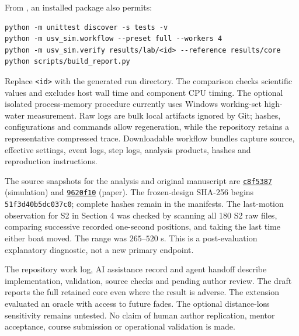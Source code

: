 From , an installed package also permits:
\begin{verbatim}
python -m unittest discover -s tests -v
python -m usv_sim.workflow --preset full --workers 4
python -m usv_sim.verify results/lab/<id> --reference results/core
python scripts/build_report.py
\end{verbatim}
Replace \texttt{<id>} with the generated run directory. The comparison checks scientific values and excludes host wall time and component CPU timing. The optional isolated process-memory procedure currently uses Windows working-set high-water measurement. Raw logs are bulk local artifacts ignored by Git; hashes, configurations and commands allow regeneration, while the repository retains a representative compressed trace. Downloadable workflow bundles capture source, effective settings, event logs, step logs, analysis products, hashes and reproduction instructions.



The source snapshots for the analysis and original manuscript are \href{https://github.com/ADreLOI/RMSW-Project/tree/c8f5387}{\texttt{c8f5387}} (simulation) and \href{https://github.com/ADreLOI/RMSW-Project/tree/9620f10da721a64ccd2bc245ba4da389b17d8436}{\texttt{9620f10}} (paper). The frozen-design SHA-256 begins \texttt{51f3d40b5dc037c0}; complete hashes remain in the manifests. The last-motion observation for S2 in Section 4 was checked by scanning all 180 S2 raw files, comparing successive recorded one-second positions, and taking the last time either boat moved. The range was $265$--$520$ s. This is a post-evaluation explanatory diagnostic, not a new primary endpoint.

The repository work log, AI assistance record and agent handoff describe implementation, validation, source checks and pending author review. The draft reports the full retained core even where the result is adverse. The extension evaluated an oracle with access to future fades. The optional distance-loss sensitivity remains untested. No claim of human author replication, mentor acceptance, course submission or operational validation is made.
